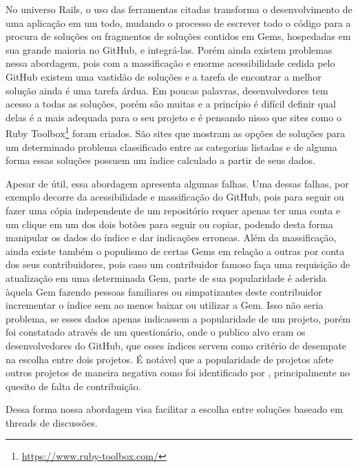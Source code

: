 No universo Rails, o uso das ferramentas citadas transforma o desenvolvimento de uma aplicação em um todo, mudando o processo de escrever todo o código para a procura de soluções ou fragmentos de soluções contidos em Gems, hospedadas em sua grande maioria no GitHub, e integrá-las. Porém ainda existem problemas nessa abordagem, pois com a massificação e enorme acessibilidade cedida pelo GitHub existem uma vastidão de soluções e a tarefa de encontrar a melhor solução ainda é uma tarefa árdua. Em poucas palavras, desenvolvedores tem acesso a todas as soluções, porém são muitas e a princípio é difícil definir qual delas é a mais adequada para o seu projeto e é pensando nisso que sites como o Ruby Toolbox\footnote{\url{https://www.ruby-toolbox.com/}} foram criados. São sites que mostram as opções de soluções para um determinado problema classificado entre as categorias listadas e de alguma forma essas soluções possuem um índice calculado a partir de seus dados.

Apesar de útil, essa abordagem apresenta algumas falhas. Uma dessas falhas, por exemplo decorre da acessibilidade e massificação do GitHub, pois para seguir ou fazer uma cópia independente de um repositório requer apenas ter uma conta e um clique em um dos dois botões para seguir ou copiar, podendo desta forma manipular os dados do índice e dar indicações erroneas. Além da massificação, ainda existe também o populismo de certas Gems em relação a outras por conta dos seus contribuidores, pois caso um contribuidor famoso faça uma requisição de atualização em uma determinada Gem, parte de sua popularidade é aderida àquela Gem fazendo pessoas familiares ou simpatizantes deste contribuidor incrementar o índice sem ao menos baixar ou utilizar a Gem. Isso não seria problema, se esses dados apenas indicassem a popularidade de um projeto, porém foi constatado através de um questionário, onde o publico alvo eram os desenvolvedores do GitHub, que esses índices servem como critério de desempate na escolha entre dois projetos. É notável que a popularidade de projetos afete outros projetos de maneira negativa como foi identificado por \cite{michlmayr:quality_problems}, principalmente no quesito de falta de contribuição. 

Dessa forma nossa abordagem visa facilitar a escolha entre soluções baseado em threads de discussões.